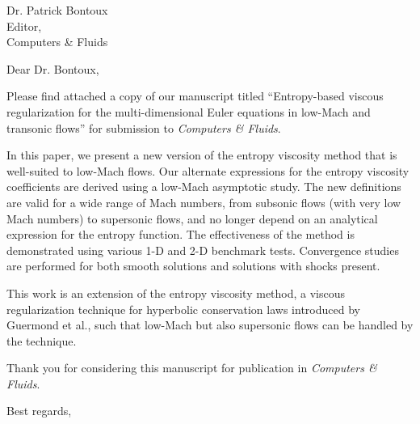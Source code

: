 \begin{letter}{Dr. Patrick Bontoux\\
    Editor,\\
    Computers \& Fluids}
\date{\today}

\opening{Dear Dr. Bontoux,}
         \vspace{0.25cm}

Please find attached a copy of our manuscript titled 
``Entropy-based viscous regularization for the multi-dimensional Euler equations in low-Mach and transonic flows'' 
for submission to {\em Computers \& Fluids}. 

In this paper, 
we present a new version of the entropy viscosity method that is well-suited to low-Mach flows.  Our alternate expressions for the entropy viscosity coefficients are derived using a low-Mach asymptotic study. 
The new definitions are valid for a wide range of Mach numbers, from subsonic flows (with very low Mach  numbers) to supersonic flows, and no longer depend on an analytical expression for the entropy function. 
The effectiveness of the method is demonstrated using various 1-D and 2-D benchmark tests. 
Convergence studies are performed for both smooth solutions and solutions with shocks present.


This work is an extension of the entropy viscosity method, a viscous regularization technique for hyperbolic conservation laws introduced by Guermond et al., 
such that low-Mach but also supersonic flows can be handled by the technique.



Thank you for considering this manuscript for publication in {\em Computers \& Fluids}.

\vspace{0.25cm}



\closing{Best regards, }

\end{letter}


